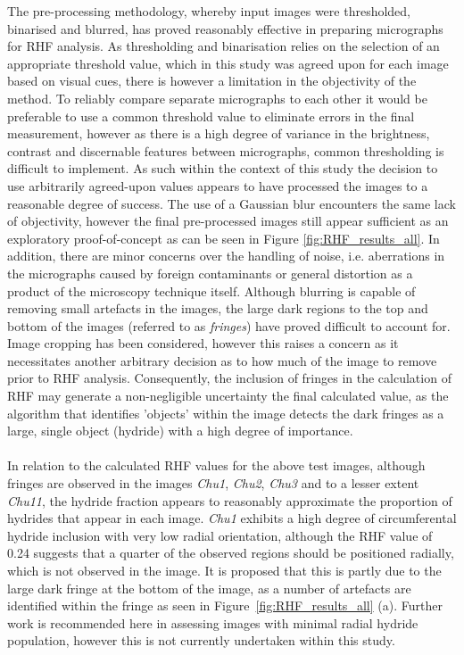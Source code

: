 \documentclass{article}
\begin{document}
    The pre-processing methodology, whereby input images were thresholded, binarised and blurred, has proved reasonably effective in preparing micrographs for RHF analysis. As thresholding and binarisation relies on the selection of an appropriate threshold value, which in this study was agreed upon for each image based on visual cues, there is however a limitation in the objectivity of the method. To reliably compare separate micrographs to each other it would be preferable to use a common threshold value to eliminate errors in the final measurement, however as there is a high degree of variance in the brightness, contrast and discernable features between micrographs, common thresholding is difficult to implement. As such within the context of this study the decision to use arbitrarily agreed-upon values appears to have processed the images to a reasonable degree of success. The use of a Gaussian blur encounters the same lack of objectivity, however the final pre-processed images still appear sufficient as an exploratory proof-of-concept as can be seen in Figure \ref{fig:RHF_results_all}.
    In addition, there are minor concerns over the handling of noise, i.e. aberrations in the micrographs caused by foreign contaminants or general distortion as a product of the microscopy technique itself. Although blurring is capable of removing small artefacts in the images, the large dark regions to the top and bottom of the images (referred to as \textit{fringes}) have proved difficult to account for. Image cropping has been considered, however this raises a concern as it necessitates another arbitrary decision as to how much of the image to remove prior to RHF analysis. Consequently, the inclusion of fringes in the calculation of RHF may generate a non-negligible uncertainty the final calculated value, as the algorithm that identifies 'objects' within the image detects the dark fringes as a large, single object (hydride) with a high degree of importance.
    \\
    \\
    In relation to the calculated RHF values for the above test images, although fringes are observed in the images \textit{Chu1}, \textit{Chu2}, \textit{Chu3} and to a lesser extent \textit{Chu11}, the hydride fraction appears to reasonably approximate the proportion of hydrides that appear in each image. \textit{Chu1} exhibits a high degree of circumferental hydride inclusion with very low radial orientation, although the RHF value of 0.24 suggests that a quarter of the observed regions should be positioned radially, which is not observed in the image. It is proposed that this is partly due to the large dark fringe at the bottom of the image, as a number of artefacts are identified within the fringe as seen in Figure~\ref{fig:RHF_results_all} (a). Further work is recommended here in assessing images with minimal radial hydride population, however this is not currently undertaken within this study.
\end{document}
